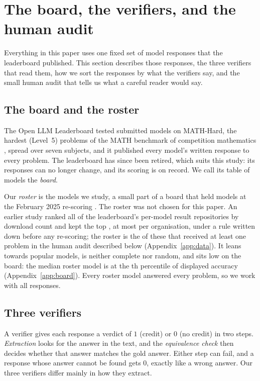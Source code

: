 \section{The board, the verifiers, and the human audit}
\label{sec:data}

Everything in this paper uses one fixed set of model responses that the leaderboard published.
This section describes those responses, the three verifiers that read them, how we sort the
responses by what the verifiers say, and the small human audit that tells us what a careful
reader would say.

\subsection{The board and the roster}

The Open LLM Leaderboard \citep{openllmleaderboard, fourrier2024openllm} tested submitted models
on MATH-Hard, the \NumItems{} hardest (Level~5) problems of the MATH benchmark of competition
mathematics \citep{hendrycksmath2021}, spread over seven subjects, and it published every model's
written response to every problem. The leaderboard has since been retired, which suits this
study: its responses can no longer change, and its scoring is on record. We call its table of
models the \emph{board}.

Our \emph{roster} is the \NumModels{} models we study, a small part of a board that held
\BoardModelsRescored{} models at the February 2025 re-scoring \citep{kydlicek2025fixing}. The
roster was not chosen for this paper. An earlier study ranked all \RosterCatalogued{} of the
leaderboard's per-model result repositories by download count and kept the top \RosterSelected{},
at most \RosterMaxPerOrg{} per organisation, under a rule written down before any re-scoring; the
roster is the \NumModels{} of these that received at least one problem in the human audit described
below (Appendix~\ref{app:data}). It leans towards popular models, is neither complete nor random,
and sits low on the board: the median roster model is at the \RosterPctMedian{}th percentile of
displayed accuracy (Appendix~\ref{app:board}). Every roster model answered every problem, so we
work with all \NumRows{} responses.

\subsection{Three verifiers}
\label{sec:verifiers}

A verifier gives each response a verdict of $1$ (credit) or $0$ (no credit) in two steps.
\emph{Extraction} looks for the answer in the text, and the \emph{equivalence check} then decides
whether that answer matches the gold answer. Either step can fail, and a response whose answer
cannot be found gets $0$, exactly like a wrong answer. Our three verifiers differ mainly in how they
extract.

